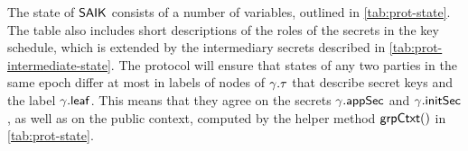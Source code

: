 
The state of ${\normalfont\textsf{SAIK}}$ consists of a number of variables, outlined in \cref{tab:prot-state}. The table also includes short
descriptions of the roles of the secrets in the key schedule, which is extended by the intermediary secrets described in
\cref{tab:prot-intermediate-state}. The protocol will ensure that states of any two parties in
the same epoch differ at most in labels of nodes of $\gamma.\tau$ that describe secret keys and the label
$\gamma.{\mathsf{leaf}}$. This means that they agree on the secrets $\gamma.{\mathsf{appSec}}$ and $\gamma.{\mathsf{initSec}}$, as well
as on the public context, computed by the helper method ${\mathsf{grpCtxt}}()$ in \cref{tab:prot-state}.



